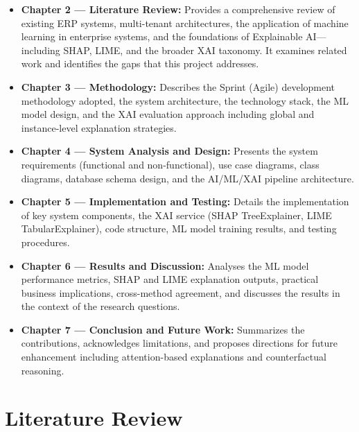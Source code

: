 \documentclass[12pt,a4paper]{report}
\begin{document}
\begin{itemize}
  \item \textbf{Chapter 2 --- Literature Review:} Provides a comprehensive review of existing ERP systems, multi-tenant architectures, the application of machine learning in enterprise systems, and the foundations of Explainable AI---including SHAP, LIME, and the broader XAI taxonomy. It examines related work and identifies the gaps that this project addresses.

  \item \textbf{Chapter 3 --- Methodology:} Describes the Sprint (Agile) development methodology adopted, the system architecture, the technology stack, the ML model design, and the XAI evaluation approach including global and instance-level explanation strategies.

  \item \textbf{Chapter 4 --- System Analysis and Design:} Presents the system requirements (functional and non-functional), use case diagrams, class diagrams, database schema design, and the AI/ML/XAI pipeline architecture.

  \item \textbf{Chapter 5 --- Implementation and Testing:} Details the implementation of key system components, the XAI service (SHAP TreeExplainer, LIME TabularExplainer), code structure, ML model training results, and testing procedures.

  \item \textbf{Chapter 6 --- Results and Discussion:} Analyses the ML model performance metrics, SHAP and LIME explanation outputs, practical business implications, cross-method agreement, and discusses the results in the context of the research questions.

  \item \textbf{Chapter 7 --- Conclusion and Future Work:} Summarizes the contributions, acknowledges limitations, and proposes directions for future enhancement including attention-based explanations and counterfactual reasoning.
\end{itemize}


%
%
\chapter{Literature Review}
\label{ch:literature_review}
\end{document}
